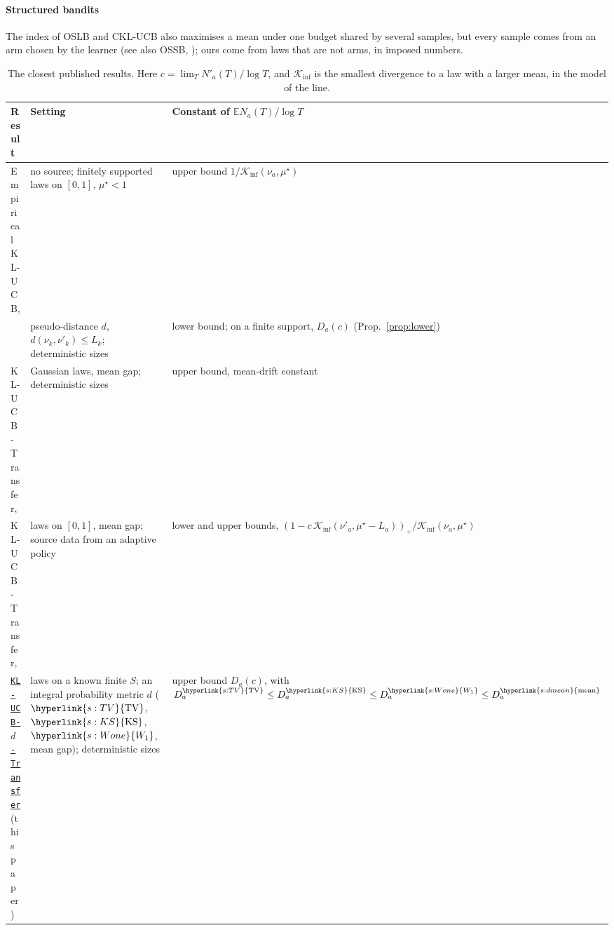 \documentclass[11pt]{article}
\newcommand{\E}{\mathbb{E}}
\newcommand{\Kinf}{\mathcal{K}_{\inf}}
\newcommand{\sy}[2]{{\hyperlink{#1}{#2}}}
\newcommand{\TV}{\sy{s:TV}{\mathrm{TV}}}
\newcommand{\KSd}{\sy{s:KS}{\mathrm{KS}}}
\newcommand{\Wone}{\sy{s:Wone}{W_{1}}}
\newcommand{\dmean}{\sy{s:dmean}{\mathrm{mean}}}
\newcommand{\Alg}{\hyperref[alg:index]{\texttt{KL-UCB-$d$-Transfer}}}
\begin{document}
\paragraph{Structured bandits} The index of OSLB and CKL-UCB \citep[Section~4.1]{MCP14} also
maximises a mean under one budget shared by several samples, but every sample comes from an arm
chosen by the learner (see also OSSB, \citealp[Section~5]{CMP17}); ours come from laws that are
not arms, in imposed numbers.

\begin{table}[t]
\centering\small
\caption{The closest published results. Here $c=\lim_TN'_a(T)/\log T$, and $\Kinf$ is the smallest
divergence to a law with a larger mean, in the model of the line.}
\label{tab:comparison}
\begin{tabular}{@{}p{}p{}p{}@{}}
\toprule
\raggedright Result & \raggedright Setting & Constant of $\E N_a(T)/\log T$\tabularnewline
\midrule
\raggedright Empirical KL-UCB, \citet[Thm.~2]{CGMMS13} & \raggedright no source; finitely supported
laws on $[0,1]$, $\mu^\star<1$ & upper bound $1/\Kinf(\nu_a,\mu^\star)$\tabularnewline
\raggedright \citet[Thm.~3]{PMM25} & \raggedright pseudo-distance $d$, $d(\nu_k,\nu'_k)\le L_k$;
deterministic sizes & lower bound; on a finite support, $D_a(c)$ (Prop.~\ref{prop:lower})\tabularnewline
\raggedright KL-UCB-Transfer, \citet[Thm.~6]{PMM25} & \raggedright Gaussian laws, mean gap;
deterministic sizes & upper bound, mean-drift constant\tabularnewline
\raggedright KL-UCB-Transfer, \citet[Thms.~2,~3]{PMRM26} & \raggedright laws on $[0,1]$, mean gap;
source data from an adaptive policy & lower and upper bounds,
$(1-c\,\Kinf(\nu'_a,\mu^\star-L_a))_+/\Kinf(\nu_a,\mu^\star)$\tabularnewline
\raggedright \Alg{} (this paper) & \raggedright laws on a known finite $S$; an integral
probability metric $d$ ($\TV$, $\KSd$, $\Wone$, mean gap); deterministic sizes & upper bound
$D_a(c)$, with $D^{\TV}_a\le D^{\KSd}_a\le D^{\Wone}_a\le D^{\dmean}_a$\tabularnewline
\bottomrule
\end{tabular}
\end{table}
\end{document}
